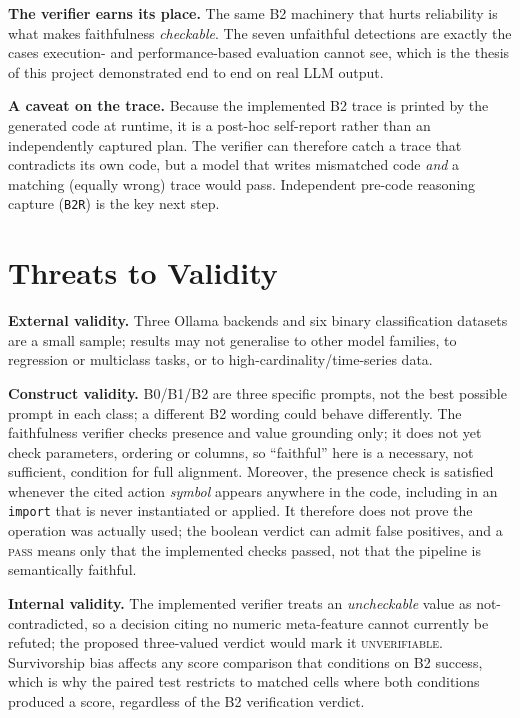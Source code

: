 \textbf{The verifier earns its place.} The same B2 machinery that
hurts reliability is what makes faithfulness \emph{checkable}. The
seven unfaithful detections are exactly the cases execution- and
performance-based evaluation cannot see, which is the thesis of this
project demonstrated end to end on real LLM output.

\textbf{A caveat on the trace.} Because the implemented B2 trace is
printed by the generated code at runtime, it is a post-hoc
self-report rather than an independently captured plan. The verifier
can therefore catch a trace that contradicts its own code, but a model
that writes mismatched code \emph{and} a matching (equally wrong)
trace would pass. Independent pre-code reasoning capture
(\texttt{B2R}) is the key next step.

\section{Threats to Validity}

\textbf{External validity.} Three Ollama backends and six binary
classification datasets are a small sample; results may not
generalise to other model families, to regression or multiclass
tasks, or to high-cardinality/time-series data.

\textbf{Construct validity.} B0/B1/B2 are three specific prompts, not
the best possible prompt in each class; a different B2 wording could
behave differently. The faithfulness verifier checks presence and
value grounding only; it does not yet check parameters, ordering or
columns, so ``faithful'' here is a necessary, not sufficient,
condition for full alignment. Moreover, the presence check is satisfied
whenever the cited action \emph{symbol} appears anywhere in the code,
including in an \texttt{import} that is never instantiated or
applied. It therefore does not prove the operation was actually used; the
boolean verdict can admit false positives, and a \textsc{pass} means
only that the implemented checks passed, not that the pipeline is
semantically faithful.

\textbf{Internal validity.} The implemented verifier treats an
\emph{uncheckable} value as not-contradicted, so a decision citing no
numeric meta-feature cannot currently be refuted; the proposed
three-valued verdict would mark it \textsc{unverifiable}. Survivorship
bias affects any score comparison that conditions on B2 success, which
is why the paired test restricts to matched cells where both
conditions produced a score, regardless of the B2 verification verdict.

